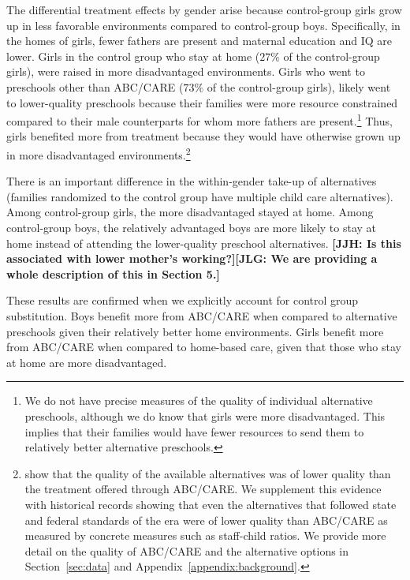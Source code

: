 The differential treatment effects by gender arise because control-group girls grow up in less favorable environments compared to control-group boys. Specifically, in the homes of girls, fewer fathers are present and maternal education and IQ are lower. Girls in the control group who stay at home ($27\%$ of the control-group girls), were raised in more disadvantaged environments. Girls who went to preschools other than ABC/CARE ($73\%$ of the control-group girls), likely went to lower-quality preschools because their families were more resource constrained compared to their male counterparts for whom more fathers are present.\footnote{We do not have precise measures of the quality of individual alternative preschools, although we do know that girls were more disadvantaged. This implies that their families would have fewer resources to send them to relatively better alternative preschools.} Thus, girls benefited more from treatment because they would have otherwise grown up in more disadvantaged environments.\footnote{\citet{Burchinal_etal_1989_CD_Daycare-Pre-K-Dev} show that the quality of the available alternatives was of lower quality than the treatment offered through ABC/CARE. We supplement this evidence with historical records showing that even the alternatives that followed state and federal standards of the era were of lower quality than ABC/CARE as measured by concrete measures such as staff-child ratios. We provide more detail on the quality of ABC/CARE and the alternative options in Section~\ref{sec:data} and Appendix~\ref{appendix:background}.}

There is an important difference in the within-gender take-up of alternatives (families randomized to the control group have multiple child care alternatives). Among control-group girls, the more disadvantaged stayed at home. Among control-group boys, the relatively advantaged boys are more likely to stay at home instead of attending the lower-quality preschool alternatives. \textbf{[JJH: Is this associated with lower mother's working?][JLG: We are providing a whole description of this in Section 5.]}

These results are confirmed when we explicitly account for control group substitution. Boys benefit more from ABC/CARE when compared to alternative preschools given their relatively better home environments. Girls benefit more from ABC/CARE when compared to home-based care, given that those who stay at home are more disadvantaged.

